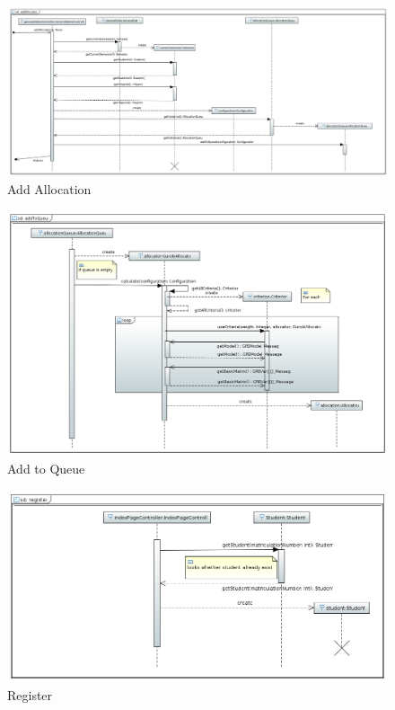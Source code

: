 \documentclass[parskip=full]{scrartcl}
\begin{document}
\begin{figure}
\centering
\includegraphics[width=\linewidth]{bilder/seqAddAllocation.png}
\caption{Add Allocation}
\label{seq:addAlloction}
\end{figure}

\begin{figure}
\centering
\includegraphics[width=\linewidth]{bilder/seqaddToQueue.png}
\caption{Add to Queue}
\label{seq:addToQueue}
\end{figure}

\begin{figure}
\centering
\includegraphics[width=\linewidth]{bilder/seqregister.png}
\caption{Register}
\label{seq:register}
\end{figure}
\end{document}
